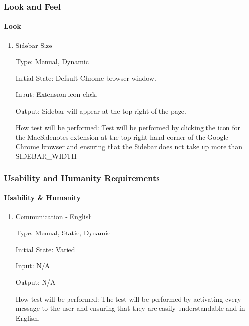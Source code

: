 \documentclass[12pt, titlepage]{article}
\begin{document}
\subsubsection{Look and Feel}
		
\paragraph{Look}

\begin{enumerate}

\item{Sidebar Size\\}

Type: Manual, Dynamic

Initial State: Default Chrome browser window.

Input: Extension icon click.

Output: Sidebar will appear at the top right of the page.

How test will be performed: Test will be performed by clicking the icon for the 
MacSidenotes extension at the top right hand corner of the Google Chrome browser and 
ensuring that the Sidebar does not take up more than SIDEBAR\_WIDTH		
 
\end{enumerate}

\subsubsection{Usability and Humanity Requirements}

\paragraph{Usability \& Humanity}

\begin{enumerate}

\item{Communication - English\\}

Type: Manual, Static, Dynamic

Initial State: Varied

Input: N/A

Output: N/A

How test will be performed: The test will be performed by activating every message to the 
user and ensuring that they are easily understandable and in English. 

\end{enumerate}
\end{document}
